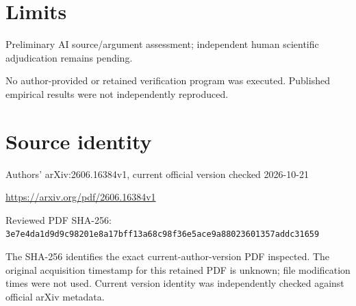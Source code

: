 \documentclass[11pt]{article}
\begin{document}
\section*{Limits}

Preliminary AI source/argument assessment; independent human scientific adjudication remains pending.\par

No author-provided or retained verification program was executed. Published empirical results were not independently reproduced.\par

\section*{Source identity}

Authors’ arXiv:2606.16384v1, current official version checked 2026-10-21

\url{https://arxiv.org/pdf/2606.16384v1}

Reviewed PDF SHA-256: \nolinkurl{3e7e4da1d9d9c98201e8a17bff13a68c98f36e5ace9a88023601357addc31659}

The SHA-256 identifies the exact current-author-version PDF inspected. The original acquisition timestamp for this retained PDF is unknown; file modification times were not used. Current version identity was independently checked against official arXiv metadata.
\end{document}

